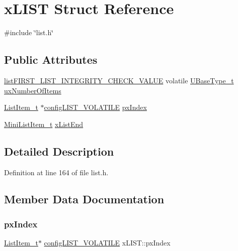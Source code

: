 \hypertarget{structxLIST}{}\section{x\+L\+I\+ST Struct Reference}
\label{structxLIST}


{\ttfamily \#include \char`\"{}list.\+h\char`\"{}}

\subsection*{Public Attributes}
\begin{DoxyCompactItemize}
\item 
\hyperlink{list_8h_a3a52b5a4f70d3a07e37a5814a23ba880}{list\+F\+I\+R\+S\+T\+\_\+\+L\+I\+S\+T\+\_\+\+I\+N\+T\+E\+G\+R\+I\+T\+Y\+\_\+\+C\+H\+E\+C\+K\+\_\+\+V\+A\+L\+UE} volatile \hyperlink{pic32mx_2portmacro_8h_a646f89d4298e4f5afd522202b11cb2e6}{U\+Base\+Type\+\_\+t} \hyperlink{structxLIST_aa280e17bf4e71f81c449c2444cb70378}{ux\+Number\+Of\+Items}
\item 
\hyperlink{list_8h_a1a62d469392f9bfe2443e7efab9c8398}{List\+Item\+\_\+t} $\ast$\hyperlink{list_8h_a2d5de557c5561c8980d1bf51d87d8cba}{config\+L\+I\+S\+T\+\_\+\+V\+O\+L\+A\+T\+I\+LE} \hyperlink{structxLIST_a7bf64d87701493b4c8c5c977682500d7}{px\+Index}
\item 
\hyperlink{list_8h_a542a8d55e98bc407593979e61f83cd02}{Mini\+List\+Item\+\_\+t} \hyperlink{structxLIST_a49ad62fa153126e27e273811167b336a}{x\+List\+End}
\end{DoxyCompactItemize}


\subsection{Detailed Description}


Definition at line 164 of file list.\+h.



\subsection{Member Data Documentation}
\mbox{\label{structxLIST_a7bf64d87701493b4c8c5c977682500d7}} 
\subsubsection{\texorpdfstring{px\+Index}{pxIndex}}
{\footnotesize\ttfamily \hyperlink{list_8h_a1a62d469392f9bfe2443e7efab9c8398}{List\+Item\+\_\+t}$\ast$ \hyperlink{list_8h_a2d5de557c5561c8980d1bf51d87d8cba}{config\+L\+I\+S\+T\+\_\+\+V\+O\+L\+A\+T\+I\+LE} x\+L\+I\+S\+T\+::px\+Index}



